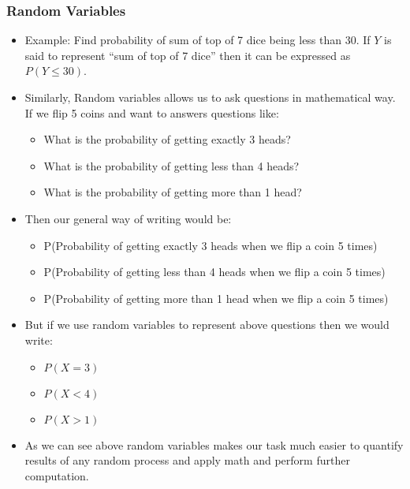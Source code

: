 \begin{frame}\frametitle{Random Variables}
\begin{itemize}
\item Example: Find probability of sum of top of 7 dice being less than 30.
If $Y$ is said to represent ``sum of top of 7 dice'' then it can be expressed as $P(Y \leq 30)$.
\item Similarly, Random variables allows us to ask questions in mathematical way.
If we flip 5 coins and want to answers questions like:
\begin{itemize}
\item What is the probability of getting exactly 3 heads?
\item What is the probability of getting less than 4 heads?
\item What is the probability of getting more than 1 head?
\end{itemize}
\item Then our general way of writing would be:
\begin{itemize}
\item P(Probability of getting exactly 3 heads when we flip a coin 5 times)
\item P(Probability of getting less than 4 heads when we flip a coin 5 times)
\item P(Probability of getting more than 1 head when we flip a coin 5 times)
\end{itemize}
\item But if we use random variables to represent above questions then we would write:
\begin{itemize}
\item $P(X=3)$
\item $P(X<4)$
\item $P(X>1)$
\end{itemize}
\item As we can see above random variables makes our task much easier to quantify results of any random process and apply math and perform further computation.
\end{itemize}
\end{frame}

